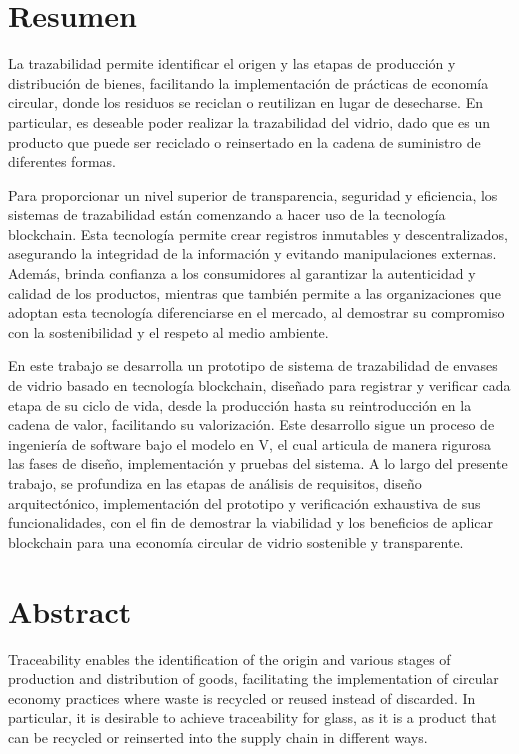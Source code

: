 \thispagestyle{plain}
\chapter*{Resumen}

La trazabilidad permite identificar el origen y las etapas de producción y distribución de bienes, facilitando la implementación de prácticas de economía circular, donde los residuos se reciclan o reutilizan en lugar de desecharse. En particular, es deseable poder realizar la trazabilidad del vidrio, dado que es un producto que puede ser reciclado o reinsertado en la cadena de suministro de diferentes formas.

Para proporcionar un nivel superior de transparencia, seguridad y eficiencia, los sistemas de trazabilidad están comenzando a hacer uso de la tecnología blockchain. Esta tecnología permite crear registros inmutables y descentralizados, asegurando la integridad de la información y evitando manipulaciones externas. Además, brinda confianza a los consumidores al garantizar la autenticidad y calidad de los productos, mientras que también permite a las organizaciones que adoptan esta tecnología diferenciarse en el mercado, al demostrar su compromiso con la sostenibilidad y el respeto al medio ambiente.

En este trabajo se desarrolla un prototipo de sistema de trazabilidad de envases de vidrio basado en tecnología blockchain, diseñado para registrar y verificar cada etapa de su ciclo de vida, desde la producción hasta su reintroducción en la cadena de valor, facilitando su valorización. Este desarrollo sigue un proceso de ingeniería de software bajo el modelo en V, el cual articula de manera rigurosa las fases de diseño, implementación y pruebas del sistema. A lo largo del presente trabajo, se profundiza en las etapas de análisis de requisitos, diseño arquitectónico, implementación del prototipo y verificación exhaustiva de sus funcionalidades, con el fin de demostrar la viabilidad y los beneficios de aplicar blockchain para una economía circular de vidrio sostenible y transparente.

\chapter*{Abstract}

Traceability enables the identification of the origin and various stages of production and distribution of goods, facilitating the implementation of circular economy practices where waste is recycled or reused instead of discarded. In particular, it is desirable to achieve traceability for glass, as it is a product that can be recycled or reinserted into the supply chain in different ways.

